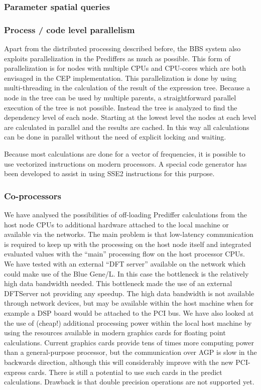 \documentclass[10pt]{lofar}
\newcommand{\todo}[1]{\begin{center}\fbox{\parbox{0.9\textwidth}{\textbf{!!FIXME!! #1}}}\end{center}}
\begin{document}
\todo{Possibility of mistakes is also large!}


\subsubsection{Parameter spatial queries}
\subsubsection{Process / code level parallelism}
Apart from the distributed processing described before, the BBS system also exploits parallelization in the Prediffers as much as possible. This form of parallelization is for nodes with multiple CPUs and CPU-cores which are both envisaged in the CEP implementation. This parallelization is done by using multi-threading in the calculation of the result of the expression tree. Because a node in the tree can be used by multiple parents, a straightforward parallel execution of the tree is not possible. Instead the tree is analyzed to find the dependency level of each node. Starting at the lowest level the nodes at each level are calculated in parallel and the results are cached. In this way all calculations can be done in parallel without the need of explicit locking and waiting.

Because most calculations are done for a vector of frequencies, it is possible to use vectorized instructions on modern processors. A special code generator has been developed to assist in using SSE2 instructions for this purpose.

\subsubsection{Co-processors}
We have analysed the possibilities of off-loading Prediffer calculations from the host node CPUs to additional hardware attached to the local machine or available via the networks. The main problem is that low-latency communication is required to keep up with the processing on the host node itself and integrated evaluated values with the “main” processing flow on the host processor CPUs.
We have tested with an external “DFT server” available on the network which could make use of the Blue Gene/L. In this case the bottleneck is the relatively high data bandwidth needed. This bottleneck made the use of an external DFTServer not providing any speedup.  The high data bandwidth is not available through network devices, but may be available within the host machine when for example a DSP board would be attached to the PCI bus.
We have also looked at the use of (cheap!) additional processing power within the local host machine by using the resources available in modern graphics cards for floating point calculations. Current graphics cards provide tens of times more computing power than a general-purpose processor, but the communication over AGP is slow in the backwards direction, although this will considerably improve with the new PCI-express cards. There is still a potential to use such cards in the predict calculations. Drawback is that double precision operations are not supported yet.
\end{document}
